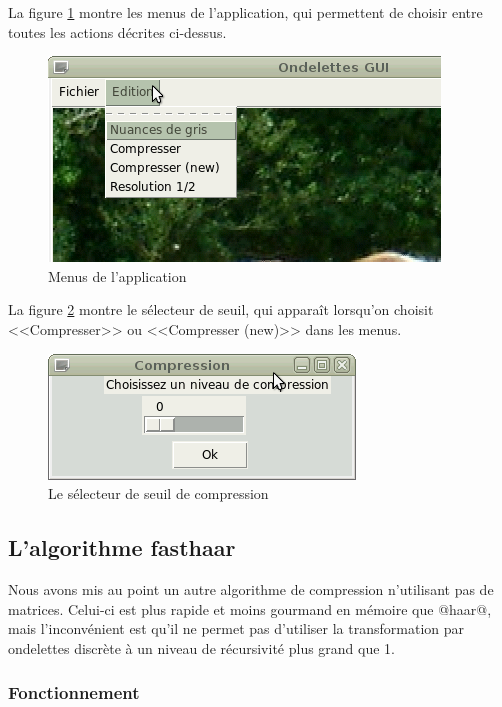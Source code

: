\documentclass{article}
\begin{document}
La figure \ref{GUI1} montre les menus de l'application, qui permettent de choisir entre toutes les actions décrites ci-dessus.

\begin{figure}[!ht]
\centering
\includegraphics[scale=0.8]{OndelettesGUI1.png}
\caption{Menus de l'application}
\label{GUI1}
\end{figure}

La figure \ref{GUI2} montre le sélecteur de seuil, qui apparaît lorsqu'on choisit <<Compresser>> ou <<Compresser (new)>> dans les menus.

\begin{figure}[!hb]
\centering
\includegraphics[scale=0.8]{Compression.png}
\caption{Le sélecteur de seuil de compression}
\label{GUI2}
\end{figure}


\cleardoublepage

\subsection{L'algorithme fasthaar}

Nous avons mis au point un autre algorithme de compression n'utilisant pas de matrices. Celui-ci est plus rapide et moins gourmand en mémoire que @haar@, mais l'inconvénient est qu'il ne permet pas d'utiliser la transformation par ondelettes discrète à un niveau de récursivité plus grand que 1.

\subsubsection{Fonctionnement}
\end{document}

